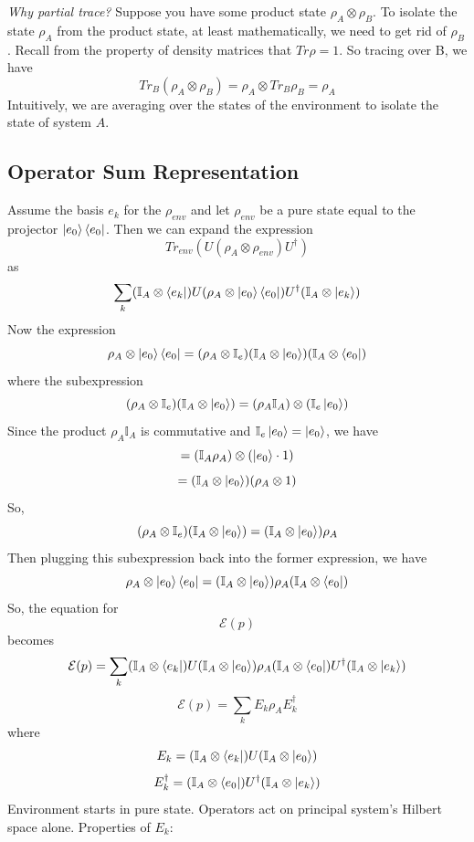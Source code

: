 \documentclass{article}
\begin{document}
 \textit{Why partial trace?} Suppose you have some product state
 \(\rho_{A} \otimes \rho_{B}\). To isolate the state \(\rho_A\) from the
 product state, at least mathematically, we need to get rid of \(\rho_B\).
 Recall from the property of density matrices that \(Tr \rho = 1\). So tracing
 over B, we have
 \[Tr_B (\rho_{A} \otimes \rho_{B}) = \rho_{A} \otimes Tr_B \rho_{B} = \rho_{A}\]
 Intuitively, we are averaging over the states of the environment to isolate
 the state of system \(A\).

\subsection{Operator Sum Representation}
Assume the basis \({e_k}\) for the \(\rho_{env}\) and let \(\rho_{env}\) be a
pure state equal to the projector \(\ket{e_0}\bra{e_0}\). Then we can
expand the expression
\[Tr_{env}(U(\rho_A \otimes \rho_{env})U^{\dagger}) \]
as
\[\sum_k (\mathbb{I}_A \otimes \bra{e_k})U(\rho_A \otimes \ket{e_0}\bra{e_0})U^{\dagger}(\mathbb{I}_A \otimes \ket{e_k})\]
Now the expression
\[\rho_A \otimes \ket{e_0}\bra{e_0} = (\rho_A \otimes \mathbb{I}_e)(\mathbb{I}_A \otimes\ket{e_0})(\mathbb{I}_A \otimes \bra{e_0})\]
where the subexpression
\[(\rho_A \otimes \mathbb{I}_e)(\mathbb{I}_A \otimes\ket{e_0}) = (\rho_A\mathbb{I}_A) \otimes (\mathbb{I}_e\ket{e_0})\]
Since the product \(\rho_A\mathbb{I}_A\) is commutative and \(\mathbb{I}_e\ket{e_0} = \ket{e_0}\),
we have
\[ = (\mathbb{I}_A\rho_A) \otimes (\ket{e_0}\cdot 1)\]
\[ = (\mathbb{I}_A \otimes \ket{e_0})(\rho_A \otimes 1)\]
So, \[(\rho_A \otimes \mathbb{I}_e)(\mathbb{I}_A \otimes\ket{e_0}) = (\mathbb{I}_A \otimes \ket{e_0})\rho_A\]
Then plugging this subexpression back into the former expression, we have
\[\rho_A \otimes \ket{e_0}\bra{e_0} = (\mathbb{I}_A \otimes \ket{e_0})\rho_A(\mathbb{I}_A \otimes \bra{e_0})\]
So, the equation for \[\mathcal{E}(p)\] becomes
\[\mathcal{E}(p) = \sum_k (\mathbb{I}_A \otimes \bra{e_k})U(\mathbb{I}_A \otimes \ket{e_0})\rho_A(\mathbb{I}_A \otimes \bra{e_0})U^{\dagger}(\mathbb{I}_A \otimes \ket{e_k})\]
\[\mathcal{E}(p) = \sum_k E_k \rho_A E^{\dagger}_k\]
where
\[E_k = (\mathbb{I}_A \otimes \bra{e_k})U(\mathbb{I}_A \otimes \ket{e_0})\]
\[E^{\dagger}_k = (\mathbb{I}_A \otimes \bra{e_0})U^{\dagger}(\mathbb{I}_A \otimes \ket{e_k})\]
Environment starts in pure state. Operators act on principal system's Hilbert space
alone.
Properties of \(E_k\):
\end{document}
